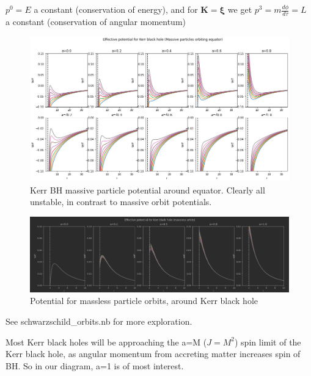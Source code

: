\documentclass{article}
\begin{document}
$p^0=E$ a constant (conservation of energy), and for $\boldsymbol{K}=\boldsymbol{\xi}$ we get $p^3=m \frac{d\phi}{d\tau}=L$ a constant (conservation of angular momentum)



\begin{figure}
    \centering
    \includegraphics[width=\textwidth]{images/massive_particle_kerr_equator.png}
    \caption{Kerr BH massive particle potential around equator. Clearly all unstable, in contrast to massive orbit potentials.}
    \label{fig:Kerr BH massive particle potential around equator}
\end{figure}


\begin{figure}
    \centering
    \includegraphics[width=\textwidth]{images/kerr massless orbit potential.png}
    \caption{Potential for massless particle orbits, around Kerr black hole}
    \label{fig:Kerr massless potential}
\end{figure}

See schwarzschild\_orbits.nb for more exploration.


Most Kerr black holes will be approaching the a=M ($J=M^2$) spin limit of the Kerr black hole, as angular momentum from accreting matter increases spin of BH. So in our diagram, a=1 is of most interest.
\end{document}
